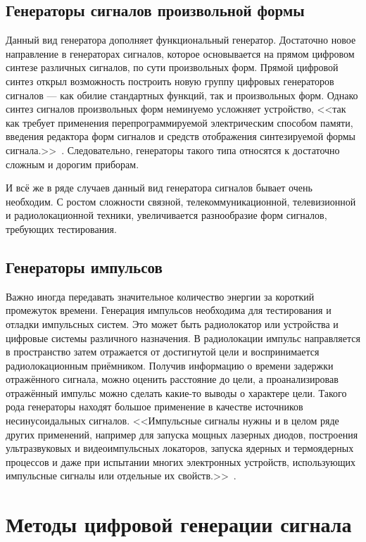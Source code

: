 \subsection*{Генераторы сигналов произвольной формы}
Данный вид генератора дополняет функциональный генератор. Достаточно новое направление в генераторах сигналов, которое основывается на прямом цифровом синтезе различных сигналов, по сути произвольных форм. Прямой цифровой синтез открыл возможность построить новую группу цифровых генераторов сигналов --- как обилие стандартных функций, так и произвольных форм. Однако синтез сигналов произвольных форм неминуемо усложняет устройство, <<так как требует применения перепрограммируемой электрическим способом памяти, введения редактора форм сигналов и средств отображения синтезируемой формы сигнала.>>~\cite{dgs}. Следовательно, генераторы такого типа относятся к достаточно сложным и дорогим приборам.

И всё же в ряде случаев данный вид генератора сигналов бывает очень необходим. С ростом сложности связной, телекоммуникационной, телевизионной и радиолокационной техники, увеличивается разнообразие форм сигналов, требующих тестирования.


\subsection*{Генераторы импульсов}
Важно иногда передавать значительное количество энергии за короткий промежуток времени. Генерация импульсов необходима для тестирования и отладки импульсных систем. Это может быть радиолокатор или устройства и цифровые системы различного назначения. В радиолокации импульс направляется в пространство затем отражается от достигнутой цели и воспринимается радиолокационным приёмником. Получив информацию о времени задержки отражённого сигнала, можно оценить расстояние до цели, а проанализировав отражённый импульс можно сделать какие-то выводы о характере цели. Такого рода генераторы находят большое применение в качестве источников несинусоидальных сигналов. <<Импульсные сигналы нужны и в целом ряде других применений, например для запуска мощных лазерных диодов, построения ультразвуковых и видеоимпульсных локаторов, запуска ядерных и термоядерных процессов и даже при испытании многих электронных устройств, использующих импульсные сигналы или отдельные их свойств.>>~\cite{dgs}.


\section{Методы цифровой генерации сигнала}

